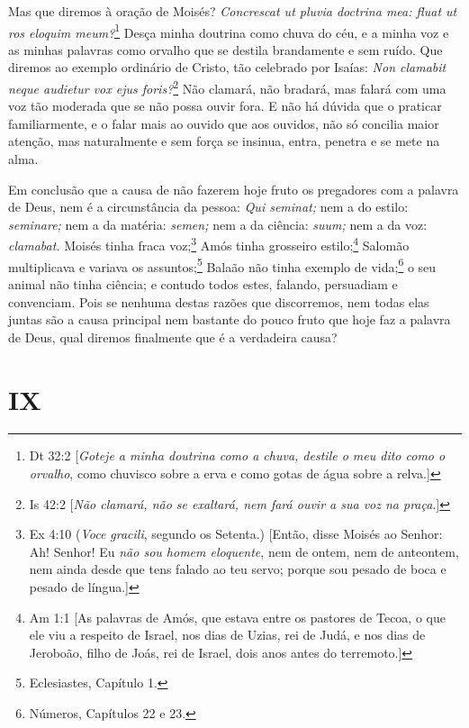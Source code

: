 Mas que diremos à oração de Moisés? \emph{Concrescat ut pluvia doctrina
mea: fluat ut ros eloquim meum?}\footnote{Dt 32:2 [\emph{Goteje a minha doutrina como a chuva, destile o meu dito como o orvalho}, como chuvisco sobre a erva e como gotas de água sobre a relva.]} Desça minha doutrina
como chuva do céu, e a minha voz e as minhas palavras como orvalho que
se destila brandamente e sem ruído. Que diremos ao exemplo ordinário
de Cristo, tão celebrado por Isaías: \emph{Non clamabit neque audietur
vox ejus foris?}\footnote{Is 42:2 [\emph{Não clamará, não se exaltará, nem fará ouvir a sua voz na praça}.]} Não clamará, não bradará, mas falará com uma voz tão
moderada que se não possa ouvir fora. E não há dúvida que o praticar
familiarmente, e o falar mais ao ouvido que aos ouvidos, não só concilia
maior atenção, mas naturalmente e sem força se insinua, entra, penetra e
se mete na alma.

Em conclusão que a causa de não fazerem hoje fruto os pregadores com a
palavra de Deus, nem é a circunstância da pessoa: \emph{Qui seminat;}
nem a do estilo: \emph{seminare;} nem a da matéria: \emph{semen;} nem a
da ciência: \emph{suum;} nem a da voz: \emph{clamabat.} Moisés tinha
fraca voz;\footnote{Ex 4:10 (\textit{Voce gracili}, segundo os Setenta.) [Então, disse Moisés ao Senhor: Ah! Senhor! Eu \emph{não sou
homem eloquente}, nem de ontem, nem de anteontem, nem ainda desde que tens falado ao teu
servo; porque sou pesado de boca e pesado de língua.]} Amós tinha grosseiro estilo;\footnote{Am 1:1 [As palavras de Amós, que estava entre os pastores de Tecoa, o que ele viu a respeito de Israel, nos dias de Uzias, rei de Judá, e nos dias de Jeroboão, filho de Joás, rei de Israel, dois anos antes do terremoto.]} Salomão multiplicava e variava
os assuntos;\footnote{Eclesiastes, Capítulo 1.} Balaão não tinha exemplo de vida;\footnote{Números, Capítulos 22 e 23.} o seu animal não tinha
ciência; e contudo todos estes, falando, persuadiam e convenciam. Pois
se nenhuma destas razões que discorremos, nem todas elas juntas são a
causa principal nem bastante do pouco fruto que hoje faz a palavra de
Deus, qual diremos finalmente que é a verdadeira causa?

\section*{IX}

